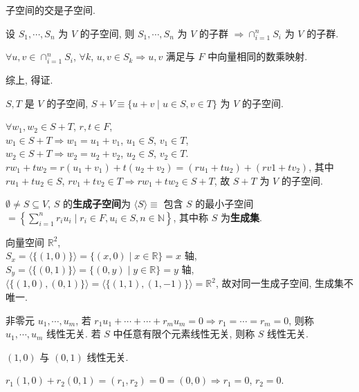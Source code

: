 \documentclass{note}
\begin{document}
子空间的交是子空间.
\begin{pf}
    设 $S_1,\cdots,S_n$ 为 $V$ 的子空间, 则 $S_1,\cdots,S_n$ 为 $V$ 的子群 $\Longrightarrow\cap_{i=1}^nS_i$ 为 $V$ 的子群.

    $\forall u,v\in\cap_{i=1}^nS_i$, $\forall k$, $u,v\in S_k\Longrightarrow u,v$ 满足与 $F$ 中向量相同的数乘映射.

    综上, 得证.
\end{pf}

$S,T$ 是 $V$ 的子空间, $S+V\equiv\{u+v\mid u\in S,v\in T\}$ 为 $V$ 的子空间.
\begin{pf}
    $\forall w_1,w_2\in S+T$, $r,t\in F$,\\
    $w_1\in S+T\Longrightarrow w_1=u_1+v_1$, $u_1\in S$, $v_1\in T$,\\
    $w_2\in S+T\Longrightarrow w_2=u_2+v_2$, $u_2\in S$, $v_2\in T$.\\
    $rw_1+tw_2=r(u_1+v_1)+t(u_2+v_2)=(ru_1+tu_2)+(rv1+tv_2)$, 其中 $ru_1+tu_2\in S$, $rv_1+tv_2\in T\Longrightarrow rw_1+tw_2\in S+T$, 故 $S+T$ 为 $V$ 的子空间.
\end{pf}

\begin{df}[生成子空间和生成集]
    $\emptyset\neq S\subseteq V$, $S$ 的\textbf{生成子空间}为 $\langle S\rangle\equiv$ 包含 $S$ 的最小子空间 $=\left\{\sum_{i=1}^nr_iu_i\mid r_i\in F,u_i\in S,n\in\mathbb{N}\right\}$, 其中称 $S$ 为\textbf{生成集}.
\end{df}

\begin{eg}
    向量空间 $\mathbb{R}^2$,\\
    $S_x=\langle\{(1,0)\}\rangle=\{(x,0)\mid x\in\mathbb{R}\}=x$ 轴,\\
    $S_y=\langle\{(0,1)\}\rangle=\{(0,y)\mid y\in\mathbb{R}\}=y$ 轴,\\
    $\langle\{(1,0),(0,1)\}\rangle=\langle\{(1,1),(1,-1)\}\rangle=\mathbb{R}^2$, 故对同一生成子空间, 生成集不唯一.
\end{eg}

\begin{df}[线性无关]
    非零元 $u_1,\cdots,u_m$, 若 $r_1u_1+\cdots+\cdots+r_mu_m=0\Longrightarrow r_1=\cdots=r_m=0$, 则称 $u_1,\cdots,u_m$ 线性无关. 若 $S$ 中任意有限个元素线性无关, 则称 $S$ 线性无关.
\end{df}

\begin{eg}
    $(1,0)$ 与 $(0,1)$ 线性无关.
\end{eg}
\begin{pf}
    $r_1(1,0)+r_2(0,1)=(r_1,r_2)=0=(0,0)\Longrightarrow r_1=0$, $r_2=0$.
\end{pf}
\end{document}
